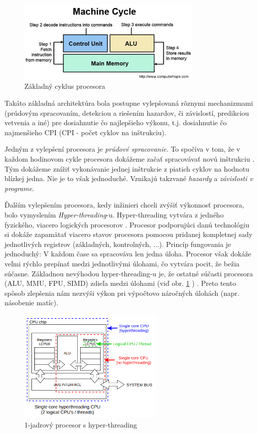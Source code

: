 \documentclass[conference]{IEEEtran}
\begin{document}
\begin{figure}[!h]
\centering
\includegraphics[width=3.5in]{img/CPU-cycle}
\caption{Základný cyklus procesora}
\end{figure}

Takáto základná architektúra bola postupne vylepšovaná rôznymi mechanizmami (prúdovým spracovaním, detekciou a riešením hazardov, či závislostí, predikciou vetvenia a iné) pre dosiahnutie čo najlepšieho výkonu, t.j. dosiahnutie čo najmenšieho CPI (CPI - počet cyklov na inštrukciu).

Jedným z vylepšení procesora je \textit{prúdové spracovanie.} To spočíva v tom, že v každom hodinovom cykle procesora dokážeme začať spracovávať novú inštrukciu \cite{hennessy2007compute}. Tým dokážeme znížiť vykonávanie jednej inštrukcie z piatich cyklov  na hodnotu blízkej jedna. Nie je to však jednoduché. Vznikajú takzvané \textit{hazardy} a \textit{závislosti v programe}. 

Ďalším vylepšením procesora, kedy inžinieri chceli zvýšiť výkonnosť procesora, bolo vymyslením \textit{Hyper-threading}-u. Hyper-threading vytvára z jedného fyzického, viacero logických procesorov \cite{hyperthreading}. Procesor podporujúci danú technológiu si dokáže zapamätať viacero stavov procesora pomocou pridanej kompletnej sady jednotlivých registrov (základných, kontrolných, ...).  
Princíp fungovania je jednoduchý: V každom čase sa spracováva len jedna úloha. Procesor však dokáže veľmi rýchlo prepínať medzi jednotlivými úlohami, čo vytvára pocit, že bežia súčasne. \newline
Základnou nevýhodou hyper-threading-u je, že ostatné súčasti procesora (ALU, MMU, FPU, SIMD) zdieľa medzi úlohami (viď obr. \ref{img} \cite{picture}) \cite{hyper2}. Preto tento spôsob zlepšenia nám nezvýši výkon pri výpočtovo náročných úlohách (napr. násobenie matíc).

\begin{figure}[!h]
\centering
\includegraphics[width=2.75in]{img/hyper}
\caption{1-jadrový procesor s hyper-threading \label{img}}
\end{figure}
\end{document}

